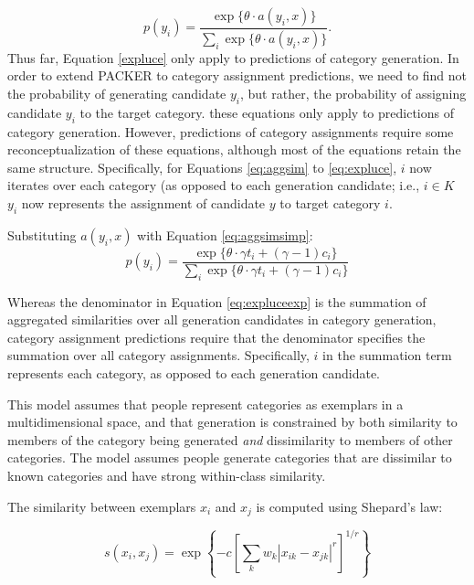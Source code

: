 \documentclass[12pt]{article} \usepackage[letterpaper, margin=1in,
\begin{document}
\begin{equation} p(y_i) = \dfrac{\exp \{\theta \cdot a(y_i, x)\}} {\sum_i{\exp
\{\theta \cdot a(y_i,x)\}}} .
\label{expluce}
\end{equation} Thus far, Equation \ref{expluce} only apply to predictions of
category generation. In order to extend PACKER to category assignment
predictions, we need to find not the probability of generating candidate $y_i$,
but rather, the probability of assigning candidate $y_i$ to the target category. 
 these equations only apply to predictions of category
generation. However, predictions of category assignments require some
reconceptualization of these equations, although most of the equations retain
the same structure. Specifically, for Equations \ref{eq:aggsim} to
\ref{eq:expluce}, $i$ now iterates over each category (as opposed to each
generation candidate; i.e., $i \in K$ $ y_i$ now represents the assignment of candidate $y$ to
target category $i$. 

Substituting $a(y_i,x)$ with Equation \ref{eq:aggsimsimp}:
\begin{equation} p(y_i) = \dfrac{\exp \{\theta \cdot \gamma t_i + (\gamma-1)
c_i\}} {\sum_i {\exp \{\theta \cdot \gamma t_i + (\gamma-1) c_i\}}}
\label{eq:expluceexp}
\end{equation}


Whereas the denominator in Equation \ref{eq:expluceexp} is the summation of
aggregated similarities over all generation candidates in category generation,
category assignment predictions require that the denominator specifies the
summation over all category assignments. Specifically, $i$ in the summation term
represents each category, as opposed to each generation candidate.

This model assumes that people represent categories as exemplars in a
multidimensional space, and that generation is constrained by both similarity to
members of the category being generated \textit{and} dissimilarity to members of
other categories. The model assumes people generate categories that are
dissimilar to known categories and have strong within-class similarity.

The similarity between exemplars $x_i$ and $x_j$ is computed using Shepard's
law:

\begin{equation} s\left(x_i,x_j\right) = \exp \left\{ -c \left[\sum_{k}{ w_k
\left| x_{ik} - x_{jk} \right|^r }\right]^{1/r} \right\}
\label{eq:similarity}
\end{equation}
\end{document}
